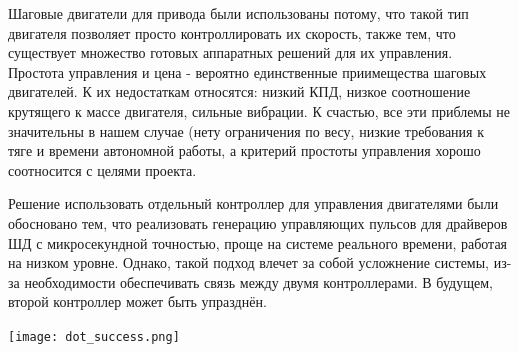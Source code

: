 \documentclass[11pt]{article}
\begin{document}
Шаговые двигатели для привода были использованы потому, что такой тип двигателя позволяет просто контроллировать их скорость, также тем, что существует множество готовых аппаратных решений для их управления. Простота управления и цена - вероятно единственные приимещества шаговых двигателей. К их недостаткам относятся: низкий КПД, низкое соотношение крутящего к массе двигателя, сильные вибрации. К счастью, все эти приблемы не значительны в нашем случае (нету ограничения по весу, низкие требования к тяге и времени автономной работы, а критерий простоты управления хорошо соотносится с целями проекта.

Решение использовать отдельный контроллер для управления двигателями были обосновано тем, что реализовать генерацию управляющих пульсов для драйверов ШД с микросекундной точностью, проще на системе реального времени, работая на низком уровне. Однако, такой подход влечет за собой усложнение системы, из-за необходимости обеспечивать связь между двумя контроллерами. В будущем, второй контроллер может быть упразднён.

\begin{center}
\texttt{[image: dot\_success.png]}
\end{center}
\end{document}
